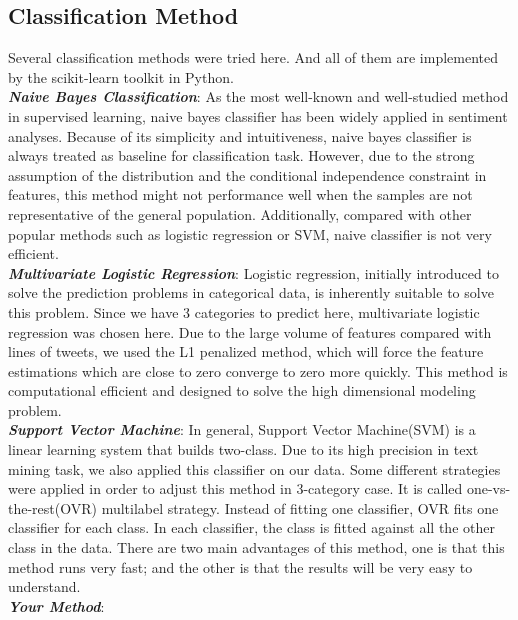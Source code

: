 \documentclass[paper=a4, fontsize=12pt]{scrartcl}
\numberwithin{equation}{section}
\numberwithin{figure}{section}
\numberwithin{table}{section}
\begin{document}
\subsection{Classification Method}
Several classification methods were tried here. And all of them are implemented by the scikit-learn toolkit in Python. \\[5pt]
\textit{\textbf{Naive Bayes Classification}}: As the most well-known and well-studied method in supervised learning, naive bayes classifier has been widely applied in sentiment analyses. Because of its simplicity and intuitiveness, naive bayes classifier is always treated as baseline for classification task. However, due to the strong assumption of the distribution and the conditional independence constraint in features, this method might not performance well when the samples are not representative of the general population. Additionally, compared with other popular methods such as logistic regression or SVM, naive classifier is not very efficient. \\[5pt]
\textit{\textbf{Multivariate Logistic Regression}}: Logistic regression, initially introduced to solve the prediction problems in categorical data, is inherently suitable to solve this problem. Since we have 3 categories to predict here, multivariate logistic regression was chosen here. Due to the large volume of features compared with lines of tweets, we used the L1 penalized method, which will force the feature estimations which are close to zero converge to zero more quickly. This method is computational efficient and designed to solve the high dimensional modeling problem.  \\[5pt]
\textit{\textbf{Support Vector Machine}}: In general, Support Vector Machine(SVM) is a linear learning system that builds two-class. Due to its high precision in text mining task, we also applied this classifier on our data. Some different strategies were applied in order to adjust this method in 3-category case. It is called one-vs-the-rest(OVR) multilabel strategy. Instead of fitting one classifier, OVR fits one classifier for each class. In each classifier, the class is fitted against all the other class in the data. There are two main advantages of this method, one is that this method runs very fast; and the other is that the results will be very easy to understand.  \\[5pt]
\textit{\textbf{Your Method}}:
\end{document}
